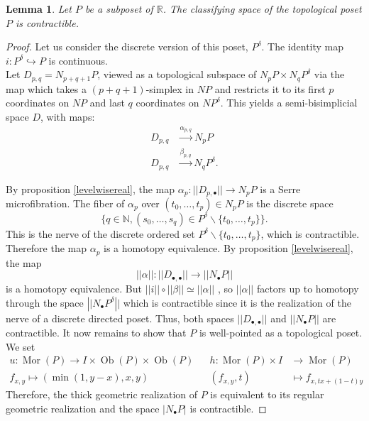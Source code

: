 \documentclass[12pt]{amsart}
\theoremstyle{plain}
\newtheorem{lem}[teo]{Lemma}
\theoremstyle{definition}
\newtheorem{defi}[teo]{Definition}
\theoremstyle{remark}
\DeclareMathOperator{\Mor}{Mor}
\DeclareMathOperator{\Ob}{Ob}
\begin{document}
\begin{lem}\label{posetthing}
    Let $P$ be a subposet of $\mathbb{R}$.
    The classifying space of the topological poset $P$ is contractible.
\end{lem}

\begin{proof}
Let us consider the discrete version of this poset, $P^\delta$. The identity map $i: P^\delta\hookrightarrow P$ is continuous.\\ %
Let $D_{p,q} = N_{p+q+1}P$, viewed as a topological subspace of $N_pP\times N_qP^\delta$ via the map which takes a $(p+q+1)$-simplex in $NP$ and restricts it to its first $p$ coordinates on $NP$ and last $q$ coordinates on $NP^\delta$.
This yields a semi-bisimplicial space $D$, with maps:
\begin{align*}
    D_{p,q} &\xrightarrow{\alpha_{p,q}} N_pP\\
    D_{p,q} &\xrightarrow{\beta_{p,q}} N_qP^\delta.
\end{align*}

By proposition \ref{levelwisereal}, the map $\alpha_p: \vert\vert D_{p,\bullet}\vert\vert\rightarrow N_pP$ is a Serre microfibration. 
The fiber of $\alpha_p$ over $(t_0,\dots, t_p) \in N_pP$ is the discrete space \[\{q\in\mathbb{N}, (s_0,\dots, s_q)\in P^\delta\backslash\{t_0,\dots, t_p\} \}.\]
This is the nerve of the discrete ordered set $P^\delta\backslash\{t_0,\dots, t_p\}$, which is contractible. 
Therefore the map $\alpha_p$ is a homotopy equivalence. 
By proposition \ref{levelwisereal}, the map \[\vert\vert\alpha\vert\vert: ||D_{\bullet,\bullet}||\rightarrow ||N_\bullet P||\] is a homotopy equivalence. 
But $\vert\vert i\vert\vert \circ ||\beta||\simeq ||\alpha||$ \cite[Lemma~5.8]{grwI}, so $\vert\vert\alpha\vert\vert$ factors up to homotopy through the space $|\vert N_\bullet P^\delta|\vert$ which is contractible since it is the realization of the nerve of a discrete directed poset. 
Thus, both spaces $||D_{\bullet,\bullet}||$ and $||N_\bullet P||$ are contractible.
It now remains to show that $P$ is well-pointed as a topological poset.
We set 
\begin{align*}
    u:\Mor(P)\rightarrow I\times\Ob(P)\times\Ob(P) &&h:\Mor(P)\times I&\rightarrow \Mor(P)\\
    f_{x,y} \mapsto (\min(1,y-x),x,y) &&(f_{x,y},t)&\mapsto f_{x,tx+(1-t)y} 
\end{align*}
Therefore, the thick geometric realization of $P$ is equivalent to its regular geometric realization and the space $|N_\bullet P|$ is contractible. %
\end{proof}
\end{document}
